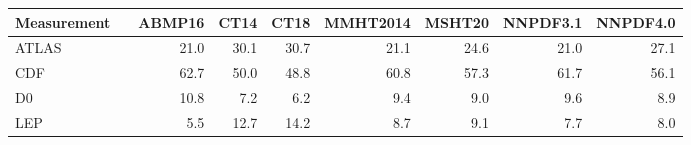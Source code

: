 \begin{tabular}{l@{\extracolsep{\fill}}rrrrrrrr}
  \hline \hline
Measurement  &   &    ABMP16  &      CT14  &      CT18  &  MMHT2014  &    MSHT20  &   NNPDF3.1  &   NNPDF4.0 \\
\hline 
                   ATLAS  &    &    21.0  &    30.1  &    30.7  &    21.1  &    24.6  &    21.0  &    27.1 \\
                   CDF &      &    62.7  &    50.0  &    48.8  &    60.8  &    57.3  &    61.7  &    56.1 \\
                   D0   &   &    10.8  &     7.2  &     6.2  &     9.4  &     9.0  &     9.6  &     8.9 \\
                 LEP  &      &     5.5  &    12.7  &    14.2  &     8.7  &     9.1  &     7.7  &     8.0 \\
\hline \hline
\end{tabular}
